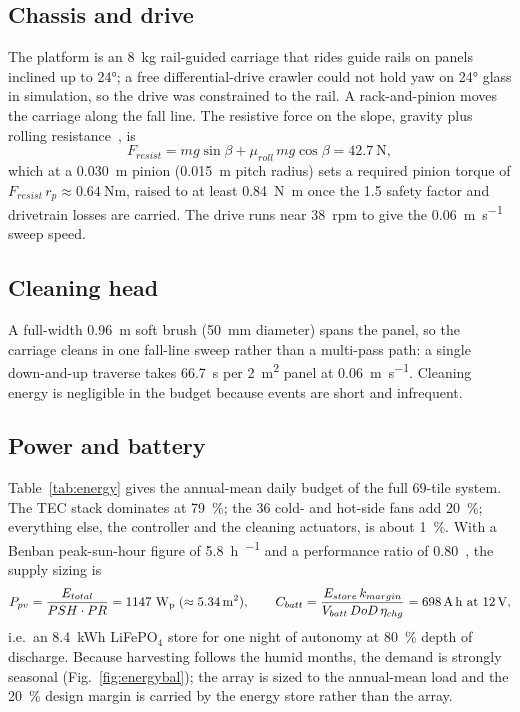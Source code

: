 \documentclass[11pt,a4paper]{article}
\newcommand{\Wp}{W\textsubscript{p}}
\begin{document}
\subsection{Chassis and drive}

The platform is an \SI{8}{\kilogram} rail-guided carriage that rides
guide rails on panels inclined up to \ang{24}; a free differential-drive
crawler could not hold yaw on \ang{24} glass in simulation, so the drive
was constrained to the rail. A rack-and-pinion moves the carriage along
the fall line. The resistive force on the slope, gravity plus rolling
resistance~\cite{siegwart2011mobilerobots}, is
\begin{equation}
  F_{resist} = mg\sin\beta + \mu_{roll}\, mg\cos\beta = \SI{42.7}{\newton},
  \label{eq:fresist}
\end{equation}
which at a \SI{0.030}{\meter} pinion (\SI{0.015}{\meter} pitch radius) sets a
required pinion torque of $F_{resist}\,r_p \approx \SI{0.64}{\newton\meter}$,
raised to at least \SI{0.84}{\newton\meter} once the 1.5 safety factor and
drivetrain losses are carried. The drive runs near \SI{38}{rpm} to give the
\SI{0.06}{\meter\per\second} sweep speed.

\subsection{Cleaning head}

A full-width \SI{0.96}{\meter} soft brush (\SI{50}{\milli\meter} diameter)
spans the panel, so the carriage cleans in one fall-line sweep rather than a
multi-pass path: a single down-and-up traverse takes \SI{66.7}{\second} per
\SI{2}{\square\meter} panel at \SI{0.06}{\meter\per\second}. Cleaning
energy is negligible in the budget because events are short and
infrequent.

\subsection{Power and battery}

Table~\ref{tab:energy} gives the annual-mean daily budget of the full
69-tile system. The TEC stack dominates at \SI{79}{\percent}; the
\num{36} cold- and hot-side fans add \SI{20}{\percent}; everything
else, the controller and the cleaning actuators, is about
\SI{1}{\percent}. With a Benban peak-sun-hour figure of
\SI{5.8}{\hour\per\dy} and a performance ratio of
\num{0.80}~\cite{nasa_power,globalsolaratlas}, the supply sizing is
\begin{equation}
  P_{pv} = \frac{E_{total}}{PSH \cdot PR} = \num{1147}~\text{\Wp}
  \;(\approx \SI{5.34}{\square\meter}),
  \qquad
  C_{batt} = \frac{E_{store}\,k_{margin}}{V_{batt}\, DoD\, \eta_{chg}}
  = \SI{698}{\ampere\hour}~\text{at}~\SI{12}{\volt},
  \label{eq:supply}
\end{equation}
i.e.\ an \SI{8.4}{\kWh} LiFePO$_4$ store for one night of autonomy at
\SI{80}{\percent} depth of discharge. Because harvesting follows the
humid months, the demand is strongly seasonal
(Fig.~\ref{fig:energybal}); the array is sized to the annual-mean load
and the \SI{20}{\percent} design margin is carried by the energy store
rather than the array.
\end{document}
